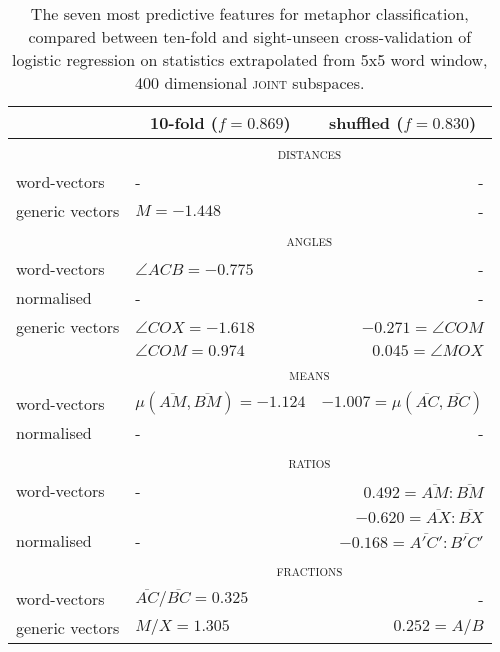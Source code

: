 \begin{table}
\centering
\begin{tabular}{llr}
\hline
& \multicolumn{1}{c}{10-fold ($f = 0.869$)} & \multicolumn{1}{c}{shuffled ($f = 0.830$)} \\
\hline
& \multicolumn{2}{c}{\textsc{distances}} \\
word-vectors& - & - \\
generic vectors & $M = -1.448$ & - \\
\hline
& \multicolumn{2}{c}{\textsc{angles}} \\
word-vectors & $\angle ACB = -0.775$ & - \\
normalised & - & - \\
generic vectors & $\angle COX = -1.618$ & $-0.271 = \angle COM$  \\
& $\angle COM = 0.974$ & $0.045 = \angle MOX$ \\
\hline
& \multicolumn{2}{c}{\textsc{means}} \\
word-vectors & $\mu(\overline{AM},\overline{BM}) = -1.124$ & $-1.007 = \mu(\overline{AC},\overline{BC})$ \\
normalised & - & - \\
\hline
& \multicolumn{2}{c}{\textsc{ratios}} \\
word-vectors & - & $0.492 = \overline{AM}:\overline{BM}$ \\
& & $-0.620 = \overline{AX}:\overline{BX}$ \\
normalised & - & $-0.168 = \overline{A'C'}:\overline{B'C'}$ \\
\hline
& \multicolumn{2}{c}{\textsc{fractions}} \\
word-vectors & $\overline{AC}/\overline{BC} = 0.325$ & - \\
generic vectors & $M/X = 1.305$ & $0.252 = A/B$ \\
\hline
\end{tabular}
\caption[Most Predictive Feature Vectors for Metaphor Classification]{The seven most predictive features for metaphor classification, compared between ten-fold and sight-unseen cross-validation of logistic regression on statistics extrapolated from 5x5 word window, 400 dimensional \textsc{joint} subspaces.}
\label{tab:metatures}
\end{table}

